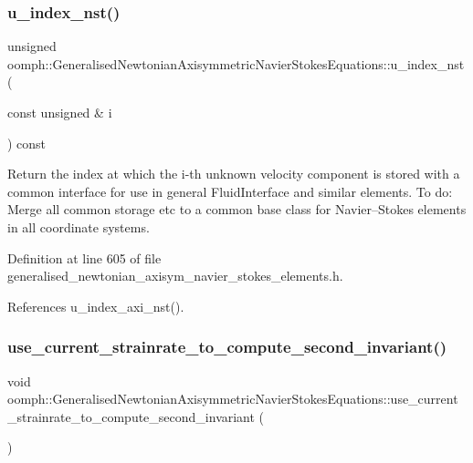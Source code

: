 \subsubsection{\texorpdfstring{u\+\_\+index\+\_\+nst()}{u\_index\_nst()}}
{\footnotesize\ttfamily unsigned oomph\+::\+Generalised\+Newtonian\+Axisymmetric\+Navier\+Stokes\+Equations\+::u\+\_\+index\+\_\+nst (\begin{DoxyParamCaption}\item[{const unsigned \&}]{i }\end{DoxyParamCaption}) const\hspace{0.3cm}{\ttfamily [inline]}}



Return the index at which the i-\/th unknown velocity component is stored with a common interface for use in general Fluid\+Interface and similar elements. To do\+: Merge all common storage etc to a common base class for Navier--Stokes elements in all coordinate systems. 



Definition at line 605 of file generalised\+\_\+newtonian\+\_\+axisym\+\_\+navier\+\_\+stokes\+\_\+elements.\+h.



References u\+\_\+index\+\_\+axi\+\_\+nst().

\mbox{\label{classoomph_1_1GeneralisedNewtonianAxisymmetricNavierStokesEquations_a4f3ab7e517760b8df34abc5fea93a35c}} 
\subsubsection{\texorpdfstring{use\+\_\+current\+\_\+strainrate\+\_\+to\+\_\+compute\+\_\+second\+\_\+invariant()}{use\_current\_strainrate\_to\_compute\_second\_invariant()}}
{\footnotesize\ttfamily void oomph\+::\+Generalised\+Newtonian\+Axisymmetric\+Navier\+Stokes\+Equations\+::use\+\_\+current\+\_\+strainrate\+\_\+to\+\_\+compute\+\_\+second\+\_\+invariant (\begin{DoxyParamCaption}{ }\end{DoxyParamCaption})\hspace{0.3cm}{\ttfamily [inline]}}



